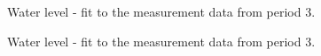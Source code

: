   \begin{figure}[H]
  \centering
   
  \vspace{-2.5mm}
  \caption{Water level - fit to the measurement data from period 3.}
  \label{fig:fit_w1w2_p3}
  \end{figure}
 \vspace{-3mm}

  \begin{figure}[H]
  \centering
   
  \vspace{-2.5mm}
  \caption{Water level - fit to the measurement data from period 3.}
  \label{fig:fit_w3_p3}
  \end{figure}
 \vspace{-3mm}





%   

%   
